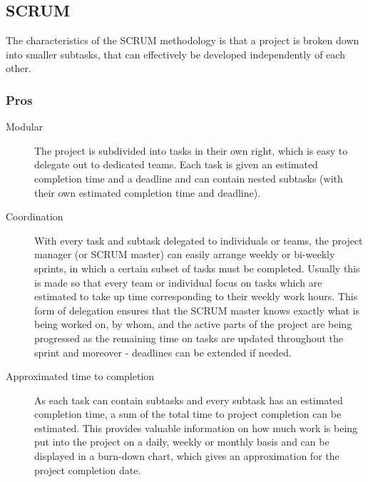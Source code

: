 \documentclass[11pt]{article}
\newcommand{\colbreak}{\vfill{\ }\columnbreak}
\begin{document}
\clearpage
\subsection{SCRUM}
\label{sec:A|sub:scrum}
The characteristics of the SCRUM methodology is that a project is broken down into smaller subtasks, that can effectively be developed independently of each other.

\begin{multicols}{2}
    \subsubsection{Pros}
    \begin{description}
    \item[Modular] The project is subdivided into tasks in their own right, which is easy to delegate out to dedicated teams. Each task is given an estimated completion time and a deadline and can contain nested subtasks (with their own estimated completion time and deadline). 
        \item[Coordination] With every task and subtask delegated to individuals or teams, the project manager (or SCRUM master) can easily arrange weekly or bi-weekly sprints, in which a certain subset of tasks must be completed. Usually this is made so that every team or individual focus on tasks which are estimated to take up time corresponding to their weekly work hours. This form of delegation ensures that the SCRUM master knows exactly what is being worked on, by whom, and the active parts of the project are being progressed as the remaining time on tasks are updated throughout the sprint and moreover - deadlines can be extended if needed.
        \item[Approximated time to completion] As each task can contain subtasks and every subtask has an estimated completion time, a sum of the total time to project completion can be estimated. This provides valuable information on how much work is being put into the project on a daily, weekly or monthly basis and can be displayed in a burn-down chart, which gives an approximation for the project completion date.
    \end{description}
    \colbreak
    

\end{multicols}
\end{document}

